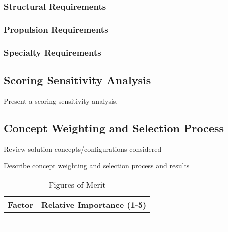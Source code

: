 \documentclass[report]{byu-aero}
\begin{document}
\subsubsection{Structural Requirements}
\label{sssec:structreqs}

\subsubsection{Propulsion Requirements}
\label{sssec:propreqs}

\subsubsection{Specialty Requirements} %
\label{sssec:specialreqs}

\subsection{Scoring Sensitivity Analysis}
\label{ssec:scoringsensitivity}

Present a scoring sensitivity analysis.

\subsection{Concept Weighting and Selection Process}
\label{ssec:selectionprocess}

Review solution concepts/configurations considered

Describe concept weighting and selection process and results
 
\begin{table}[h!]
	\centering
	\caption{Figures of Merit}
	\label{tab:fom}
	\begin{tabular}{ |c|c| } 
		\hline
		\rowcolor{BYUbluemid}
    	Factor & Relative Importance (1-5) \\ 
		\hline
	     &  \\ 
		\hline
		 &  \\ 
		\hline
		 &  \\ 
		\hline
		 &  \\ 
		\hline
		 &  \\ 
		\hline
	\end{tabular}
\end{table}
\end{document}
